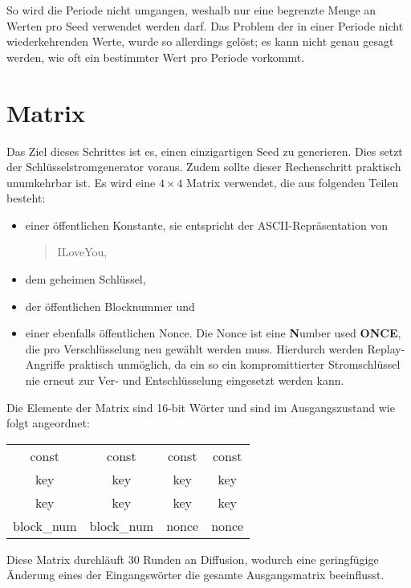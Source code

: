 \documentclass[10pt,a4paper]{article}
\begin{document}
So wird die Periode nicht umgangen, weshalb nur eine begrenzte Menge an Werten pro Seed verwendet werden darf.
Das Problem der in einer Periode nicht wiederkehrenden Werte, wurde so allerdings gelöst; es kann nicht genau gesagt werden, wie oft ein bestimmter Wert pro Periode vorkommt.

\section{Matrix}

Das Ziel dieses Schrittes ist es, einen einzigartigen Seed zu generieren.
Dies setzt der Schlüsselstromgenerator voraus.
Zudem sollte dieser Rechenschritt praktisch unumkehrbar ist.
Es wird eine $4 \times 4$ Matrix verwendet, die aus folgenden Teilen besteht:
\begin{itemize}
    \item einer öffentlichen Konstante, sie entspricht der ASCII-Repräsentation von
          \begin{quotation}
              \glqq ILoveYou\grqq{},
          \end{quotation}
    \item dem geheimen Schlüssel,
    \item der öffentlichen Blocknummer und
    \item einer ebenfalls öffentlichen Nonce.
          Die Nonce ist eine \glqq \textbf{N}umber used \textbf{ONCE}\grqq{}, die pro Verschlüsselung neu gewählt werden muss.
          Hierdurch werden Replay-Angriffe praktisch unmöglich, da ein so ein kompromittierter Stromschlüssel nie erneut zur Ver- und Entschlüsselung eingesetzt werden kann.
\end{itemize}

Die Elemente der Matrix sind 16-bit Wörter und sind im Ausgangszustand wie folgt angeordnet:

\begin{center}
    \begin{tabular}{ c c c c }
        const      & const      & const & const \\
        key        & key        & key   & key   \\
        key        & key        & key   & key   \\
        block\_num & block\_num & nonce & nonce \\
    \end{tabular}
\end{center}

Diese Matrix durchläuft 30 Runden an Diffusion, wodurch eine geringfügige Änderung eines der Eingangswörter die gesamte Ausgangsmatrix beeinflusst.
\end{document}
